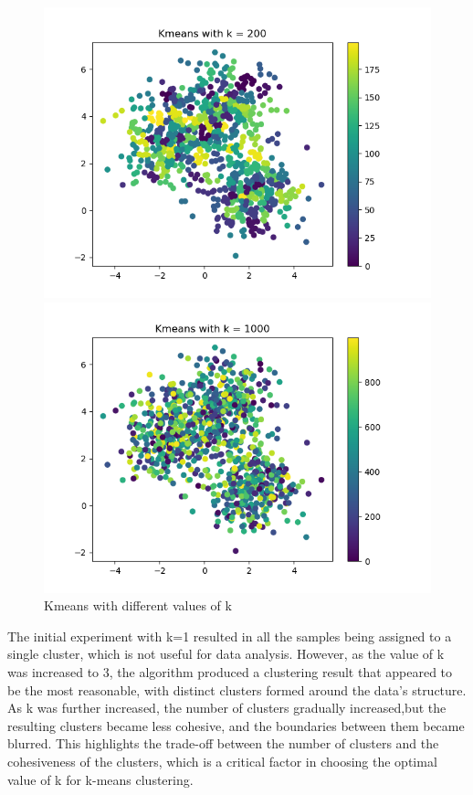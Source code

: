 \documentclass[12pt]{article}
\begin{document}
\begin{figure}[!h]
\begin{minipage}{0.5\textwidth}
    \includegraphics[scale=0.4]{images/task2_dkv__k200}
    \end{minipage}
    \begin{minipage}{0.5\textwidth}
    \centering
    \includegraphics[scale=0.4]{images/task2_dkv__k1000}
    \end{minipage}
    \caption{Kmeans with different values of k}\label{fig:figure5}
\end{figure}

The initial experiment with k=1 resulted in all the samples being assigned to a single cluster, which is not useful for data analysis.
However, as the value of k was increased to 3, the algorithm produced a clustering result that appeared to be the most reasonable,
with distinct clusters formed around the data's structure.
As k was further increased, the number of clusters gradually increased,but the resulting clusters became less cohesive,
and the boundaries between them became blurred.
This highlights the trade-off between the number of clusters and the cohesiveness of the clusters, which is a
critical factor in choosing the optimal value of k for k-means clustering.
\pagebreak
\end{document}

